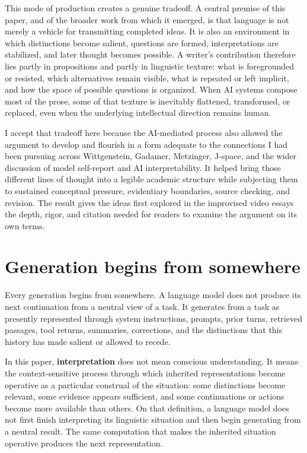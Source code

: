 \documentclass[12pt]{article}
\renewenvironment{abstract}
  {\par\small\begin{center}\bfseries\abstractname\end{center}\vspace{-0.45em}}
  {\par\normalsize}
\begin{document}
\begin{abstract}
This mode of production creates a genuine tradeoff. A central premise of this paper, and of the broader work from which it emerged, is that language is not merely a vehicle for transmitting completed ideas. It is also an environment in which distinctions become salient, questions are formed, interpretations are stabilized, and later thought becomes possible. A writer's contribution therefore lies partly in propositions and partly in linguistic texture: what is foregrounded or resisted, which alternatives remain visible, what is repeated or left implicit, and how the space of possible questions is organized. When AI systems compose most of the prose, some of that texture is inevitably flattened, transformed, or replaced, even when the underlying intellectual direction remains human.

I accept that tradeoff here because the AI-mediated process also allowed the argument to develop and flourish in a form adequate to the connections I had been pursuing across Wittgenstein, Gadamer, Metzinger, J-space, and the wider discussion of model self-report and AI interpretability. It helped bring those different lines of thought into a legible academic structure while subjecting them to sustained conceptual pressure, evidentiary boundaries, source checking, and revision. The result gives the ideas first explored in the improvised video essays the depth, rigor, and citation needed for readers to examine the argument on its own terms.
\end{abstract}
\vspace{0.75em}

\section{Generation begins from somewhere}\label{generation-begins-from-somewhere}

Every generation begins from somewhere. A language model does not produce its next continuation from a neutral view of a task. It generates from a task as presently represented through system instructions, prompts, prior turns, retrieved passages, tool returns, summaries, corrections, and the distinctions that this history has made salient or allowed to recede.

In this paper, \textbf{interpretation} does not mean conscious understanding. It means the context-sensitive process through which inherited representations become operative as a particular construal of the situation: some distinctions become relevant, some evidence appears sufficient, and some continuations or actions become more available than others. On that definition, a language model does not first finish interpreting its linguistic situation and then begin generating from a neutral result. The same computation that makes the inherited situation operative produces the next representation.
\end{document}
